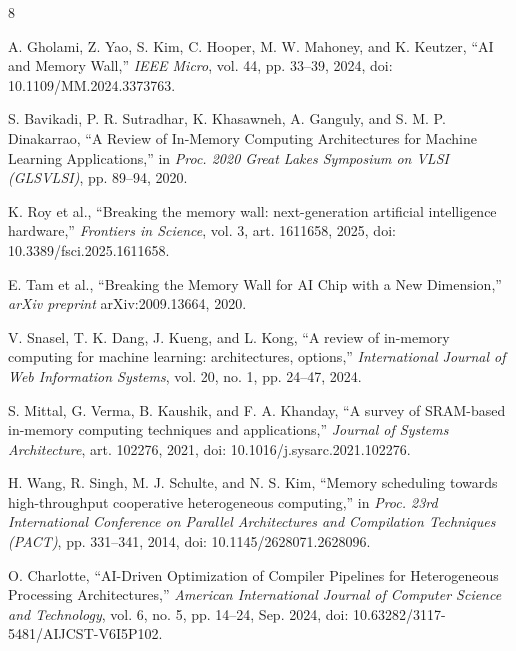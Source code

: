 \documentclass[conference]{IEEEtran}
\begin{document}

\begin{thebibliography}{8}

A. Gholami, Z. Yao, S. Kim, C. Hooper, M. W. Mahoney, and K. Keutzer, ``AI and Memory Wall,'' \emph{IEEE Micro}, vol. 44, pp. 33--39, 2024, doi: 10.1109/MM.2024.3373763.

S. Bavikadi, P. R. Sutradhar, K. Khasawneh, A. Ganguly, and S. M. P. Dinakarrao,
``A Review of In-Memory Computing Architectures for Machine Learning Applications,''
in \emph{Proc. 2020 Great Lakes Symposium on VLSI (GLSVLSI)}, pp. 89--94, 2020.

K. Roy et al., ``Breaking the memory wall: next-generation artificial intelligence hardware,''
\emph{Frontiers in Science}, vol. 3, art. 1611658, 2025, doi: 10.3389/fsci.2025.1611658.

E. Tam et al., ``Breaking the Memory Wall for AI Chip with a New Dimension,''
\emph{arXiv preprint} arXiv:2009.13664, 2020.

V. Snasel, T. K. Dang, J. Kueng, and L. Kong,
``A review of in-memory computing for machine learning: architectures, options,''
\emph{International Journal of Web Information Systems}, vol. 20, no. 1, pp. 24--47, 2024.

S. Mittal, G. Verma, B. Kaushik, and F. A. Khanday,
``A survey of SRAM-based in-memory computing techniques and applications,''
\emph{Journal of Systems Architecture}, art. 102276, 2021, doi: 10.1016/j.sysarc.2021.102276.

H. Wang, R. Singh, M. J. Schulte, and N. S. Kim,
``Memory scheduling towards high-throughput cooperative heterogeneous computing,''
in \emph{Proc. 23rd International Conference on Parallel Architectures and Compilation Techniques (PACT)}, pp. 331--341, 2014, doi: 10.1145/2628071.2628096.

O. Charlotte,
``AI-Driven Optimization of Compiler Pipelines for Heterogeneous Processing Architectures,''
\emph{American International Journal of Computer Science and Technology}, vol. 6, no. 5, pp. 14--24, Sep. 2024, doi: 10.63282/3117-5481/AIJCST-V6I5P102.

\end{thebibliography}
\end{document}
